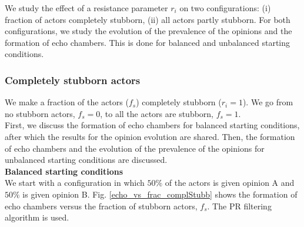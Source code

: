 \documentclass[11 pt , letterpaper , twoside , openright]{book}
\begin{document}
We study the effect of a resistance parameter $r_i$ on two configurations: (i) fraction of actors completely stubborn, (ii) all actors partly stubborn. For both configurations, we study the evolution of the prevalence of the opinions and the formation of echo chambers. This is done for balanced and unbalanced starting conditions.

\subsubsection{Completely stubborn actors}\label{complStubbAct}

We make a fraction of the actors ($f_s$) completely stubborn ($r_i = 1$). We go from no stubborn actors, $f_s=0$, to all the actors are stubborn, $f_s=1$. \\
\newline
First, we discuss the formation of echo chambers for balanced starting conditions, after which the results for the opinion evolution are shared. Then, the formation of echo chambers and the evolution of the prevalence of the opinions for unbalanced starting conditions are discussed.\\
\newline
\textbf{Balanced starting conditions}\\
\newline
We start with a configuration in which $50 \%$ of the actors is given opinion A and $50 \%$ is given opinion B. Fig. \ref{echo_vs_frac_complStubb} shows the formation of echo chambers versus the fraction of stubborn actors, $f_s$. The PR filtering algorithm is used.
\end{document}
